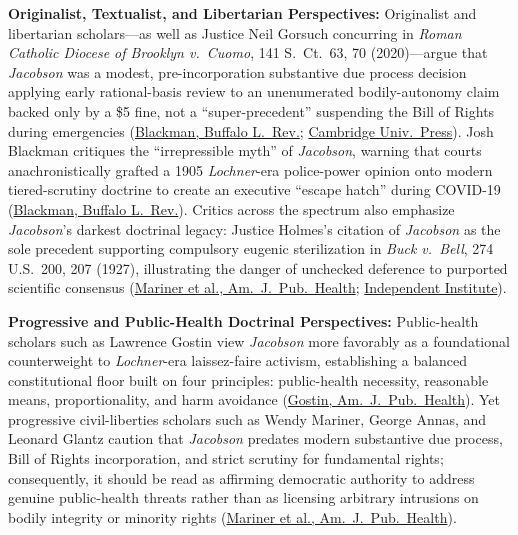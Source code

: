 \documentclass[12pt]{article}
\begin{document}
\textbf{Originalist, Textualist, and Libertarian Perspectives:} Originalist and libertarian scholars---as well as Justice Neil Gorsuch concurring in \textit{Roman Catholic Diocese of Brooklyn v.\ Cuomo}, 141 S.\ Ct.\ 63, 70 (2020)---argue that \textit{Jacobson} was a modest, pre-incorporation substantive due process decision applying early rational-basis review to an unenumerated bodily-autonomy claim backed only by a \$5 fine, not a ``super-precedent'' suspending the Bill of Rights during emergencies (\href{https://digitalcommons.law.buffalo.edu/cgi/viewcontent.cgi?article=4934&context=buffalolawreview}{Blackman, Buffalo L.\ Rev.}; \href{https://www.cambridge.org/core/books/covid19-and-the-law/jacobson-question/A463868C48886F30BD127463D9796626}{Cambridge Univ.\ Press}). Josh Blackman critiques the ``irrepressible myth'' of \textit{Jacobson}, warning that courts anachronistically grafted a 1905 \textit{Lochner}-era police-power opinion onto modern tiered-scrutiny doctrine to create an executive ``escape hatch'' during COVID-19 (\href{https://digitalcommons.law.buffalo.edu/cgi/viewcontent.cgi?article=4934&context=buffalolawreview}{Blackman, Buffalo L.\ Rev.}). Critics across the spectrum also emphasize \textit{Jacobson}'s darkest doctrinal legacy: Justice Holmes's citation of \textit{Jacobson} as the sole precedent supporting compulsory eugenic sterilization in \textit{Buck v.\ Bell}, 274 U.S.\ 200, 207 (1927), illustrating the danger of unchecked deference to purported scientific consensus (\href{https://pmc.ncbi.nlm.nih.gov/articles/PMC1449224/}{Mariner et al., Am.\ J.\ Pub.\ Health}; \href{https://www.independent.org/tir/2021-spring/infectious-diseases-and-government-growth/}{Independent Institute}).

\textbf{Progressive and Public-Health Doctrinal Perspectives:} Public-health scholars such as Lawrence Gostin view \textit{Jacobson} more favorably as a foundational counterweight to \textit{Lochner}-era laissez-faire activism, establishing a balanced constitutional floor built on four principles: public-health necessity, reasonable means, proportionality, and harm avoidance (\href{https://pmc.ncbi.nlm.nih.gov/articles/PMC1449223/}{Gostin, Am.\ J.\ Pub.\ Health}). Yet progressive civil-liberties scholars such as Wendy Mariner, George Annas, and Leonard Glantz caution that \textit{Jacobson} predates modern substantive due process, Bill of Rights incorporation, and strict scrutiny for fundamental rights; consequently, it should be read as affirming democratic authority to address genuine public-health threats rather than as licensing arbitrary intrusions on bodily integrity or minority rights (\href{https://pmc.ncbi.nlm.nih.gov/articles/PMC1449224/}{Mariner et al., Am.\ J.\ Pub.\ Health}).
\end{document}
